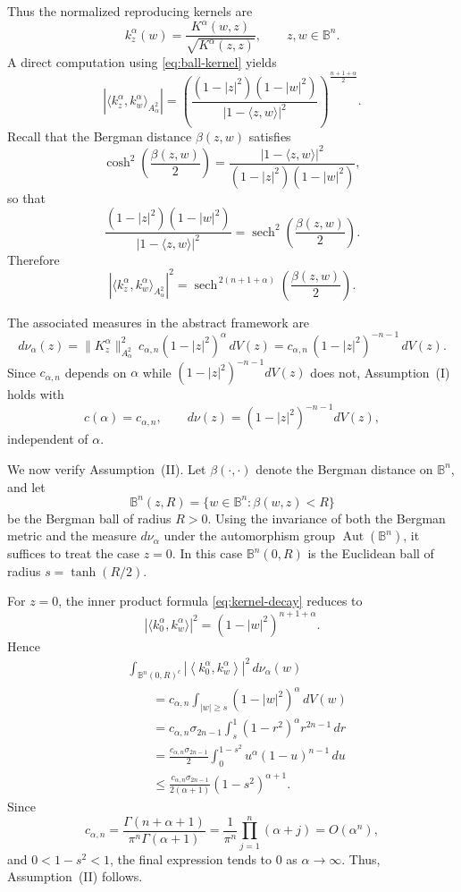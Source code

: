 \documentclass{amsart}
\theoremstyle{definition}
\theoremstyle{remark}
\numberwithin{equation}{section}
\begin{document}
\medskip

\noindent
Thus the normalized reproducing kernels are
\[
k^\alpha_z(w)
=
\frac{K^\alpha(w,z)}{\sqrt{K^\alpha(z,z)}},
\qquad 
z,w\in\mathbb{B}^n.
\]
A direct computation using \eqref{eq:ball-kernel} yields
\[
\left|
\langle k^\alpha_z, k^\alpha_w\rangle_{A^2_\alpha}
\right|
=
\left(
\frac{(1-|z|^2)(1-|w|^2)}
{|1-\langle z,w\rangle|^2}
\right)^{\frac{n+1+\alpha}{2}}.
\]
Recall that the Bergman distance $\beta(z,w)$ satisfies
\[
\cosh^2\!\left(\frac{\beta(z,w)}{2}\right)
=
\frac{|1-\langle z,w\rangle|^2}{(1-|z|^2)(1-|w|^2)},
\]
so that
\[
\frac{(1-|z|^2)(1-|w|^2)}{|1-\langle z,w\rangle|^2}
=
\operatorname{sech}^2\!\left(\frac{\beta(z,w)}{2}\right).
\]
Therefore
\begin{equation}
\left|
\langle k^\alpha_z, k^\alpha_w\rangle_{A^2_\alpha}
\right|^2
=
\operatorname{sech}^{\,2(n+1+\alpha)}\!\left(\frac{\beta(z,w)}{2}\right).
\label{eq:kernel-decay}
\end{equation}

\medskip

\noindent
The associated measures in the abstract framework are
\[
d\nu_\alpha(z)
=
\|K^\alpha_z\|^2_{A^2_\alpha}\,
c_{\alpha,n}(1-|z|^2)^\alpha\, dV(z)
=
c_{\alpha,n}\,(1-|z|^2)^{-n-1}\, dV(z).
\]
Since $c_{\alpha,n}$ depends on $\alpha$ while 
$(1-|z|^2)^{-n-1} dV(z)$ does not,  
Assumption~\textup{(I)} holds with
\[
c(\alpha)=c_{\alpha,n},
\qquad 
d\nu(z)=(1-|z|^2)^{-n-1}dV(z),
\]
independent of $\alpha$.

\medskip

\noindent
We now verify Assumption~\textup{(II)}.
Let $\beta(\cdot,\cdot)$ denote the Bergman distance on $\mathbb{B}^n$, and let
\[
\mathbb{B}^n(z,R)
=
\{w\in\mathbb{B}^n : \beta(w,z)<R\}
\]
be the Bergman ball of radius $R>0$.
Using the invariance of both the Bergman metric and the measure $d\nu_\alpha$
under the automorphism group $\operatorname{Aut}(\mathbb{B}^n)$, it suffices to treat the case $z=0$.
In this case $\mathbb{B}^n(0,R)$ is the Euclidean ball of radius $s=\tanh (R/2)$.

For $z=0$, the inner product formula \eqref{eq:kernel-decay} reduces to
\[
\left|\langle k^\alpha_0, k^\alpha_w\rangle\right|^2
=
(1-|w|^2)^{n+1+\alpha}.
\]
Hence
\begin{align*}
&\int_{\mathbb{B}^n(0,R)^c}
\left|\left\langle k_0^\alpha,k_w^\alpha\right\rangle\right|^2
\,d\nu_\alpha(w) \\
&\qquad=
c_{\alpha,n}\int_{|w|\geq s}(1-|w|^2)^\alpha\,dV(w) \\
&\qquad=
c_{\alpha,n}\sigma_{2n-1}
\int_s^1 (1-r^2)^\alpha r^{2n-1}\,dr \\
&\qquad=
\frac{c_{\alpha,n}\sigma_{2n-1}}{2}
\int_0^{1-s^2}u^\alpha(1-u)^{n-1}\,du \\
&\qquad\leq
\frac{c_{\alpha,n}\sigma_{2n-1}}{2(\alpha+1)}
(1-s^2)^{\alpha+1}.
\end{align*}
Since
\[
c_{\alpha,n}
=
\frac{\Gamma(n+\alpha+1)}{\pi^n\Gamma(\alpha+1)}
=
\frac{1}{\pi^n}\prod_{j=1}^n(\alpha+j)
=
O(\alpha^n),
\]
and $0<1-s^2<1$, the final expression tends to $0$ as
$\alpha\to\infty$. 
Thus, Assumption~\textup{(II)} follows.
\end{document}
